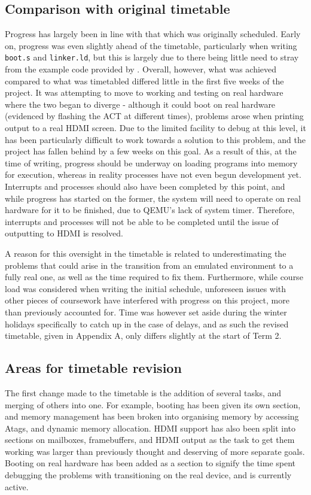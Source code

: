 \documentclass[10pt,a4paper]{article}
\newcommand{\code}[1]{\texttt{#1}}
\begin{document}
\subsection*{Comparison with original timetable}
Progress has largely been in line with that which was originally scheduled.
Early on, progress was even slightly ahead of the timetable, particularly when
writing \code{boot.s} and \code{linker.ld}, but this is largely due to there
being little need to stray from the example code provided by \cite{OSDevBoot}.
Overall, however, what was achieved compared to what was timetabled differed
little in the first five weeks of the project. It was attempting to move to
working and testing on real hardware where the two began to diverge - although
it could boot on real hardware (evidenced by flashing the ACT at different
times), problems arose when printing output to a real HDMI screen. Due to the
limited facility to debug at this level, it has been particularly difficult to
work towards a solution to this problem, and the project has fallen behind by a
few weeks on this goal. As a result of this, at the time of writing, progress
should be underway on loading programs into memory for execution, whereas in
reality processes have not even begun development yet. Interrupts and processes
should also have been completed by this point, and while progress has started on
the former, the system will need to operate on real hardware for it to be
finished, due to QEMU's lack of system timer. Therefore, interrupts and
processes will not be able to be completed until the issue of outputting to HDMI
is resolved.

A reason for this oversight in the timetable is related to underestimating the
problems that could arise in the transition from an emulated environment to a
fully real one, as well as the time required to fix them. Furthermore, while
course load was considered when writing the initial schedule, unforeseen issues
with other pieces of coursework have interfered with progress on this project,
more than previously accounted for. Time was however set aside during the winter
holidays specifically to catch up in the case of delays, and as such the revised
timetable, given in Appendix A, only differs slightly at the start of Term 2.

\subsection*{Areas for timetable revision}
The first change made to the timetable is the addition of several tasks, and
merging of others into one. For example, booting has been given its own section,
and memory management has been broken into organising memory by accessing Atags,
and dynamic memory allocation. HDMI support has also been split into sections on
mailboxes, framebuffers, and HDMI output as the task to get them working was
larger than previously thought and deserving of more separate goals. Booting on
real hardware has been added as a section to signify the time spent debugging
the problems with transitioning on the real device, and is currently active.
\end{document}
